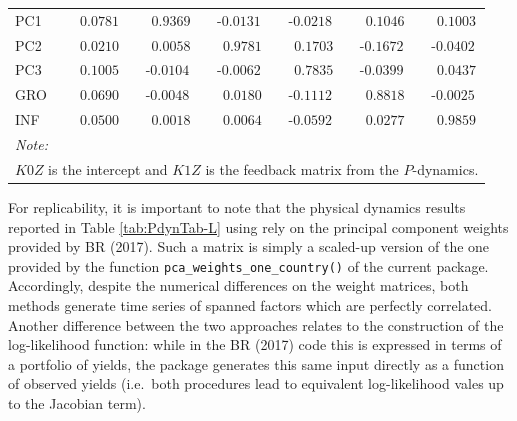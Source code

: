 \begin{table}[!h]
\begin{tabular}[t]{lcccccc}
\hspace{1em}PC1 & $\phantom{0}\phantom{0}0.0781$ & $\phantom{0}\phantom{0}0.9369$ & $\phantom{0}\text{-}0.0131$ & $\phantom{0}\text{-}0.0218$ & $\phantom{0}\phantom{0}0.1046$ & $\phantom{0}\phantom{0}0.1003$\\
\hspace{1em}PC2 & $\phantom{0}\phantom{0}0.0210$ & $\phantom{0}\phantom{0}0.0058$ & $\phantom{0}\phantom{0}0.9781$ & $\phantom{0}\phantom{0}0.1703$ & $\phantom{0}\text{-}0.1672$ & $\phantom{0}\text{-}0.0402$\\
\hspace{1em}PC3 & $\phantom{0}\phantom{0}0.1005$ & $\phantom{0}\text{-}0.0104$ & $\phantom{0}\text{-}0.0062$ & $\phantom{0}\phantom{0}0.7835$ & $\phantom{0}\text{-}0.0399$ & $\phantom{0}\phantom{0}0.0437$\\
\hspace{1em}GRO & $\phantom{0}\phantom{0}0.0690$ & $\phantom{0}\text{-}0.0048$ & $\phantom{0}\phantom{0}0.0180$ & $\phantom{0}\text{-}0.1112$ & $\phantom{0}\phantom{0}0.8818$ & $\phantom{0}\text{-}0.0025$\\
\hspace{1em}INF & $\phantom{0}\phantom{0}0.0500$ & $\phantom{0}\phantom{0}0.0018$ & $\phantom{0}\phantom{0}0.0064$ & $\phantom{0}\text{-}0.0592$ & $\phantom{0}\phantom{0}0.0277$ & $\phantom{0}\phantom{0}0.9859$\\
\bottomrule
\multicolumn{7}{l}{\rule{0pt}{1em}\textit{Note: }}\\
\multicolumn{7}{l}{\rule{0pt}{1em}$K0Z$ is the intercept and $K1Z$ is the feedback matrix from the $P$-dynamics.}\\
\end{tabular}
\end{table}

For replicability, it is important to note that the physical dynamics results reported in Table \ref{tab:PdynTab-L} using  rely on the principal component weights provided by BR (2017). Such a matrix is simply a scaled-up version of the one provided by the function \texttt{pca\_weights\_one\_country()} of the current package. Accordingly, despite the numerical differences on the weight matrices, both methods generate time series of spanned factors which are perfectly correlated. Another difference between the two approaches relates to the construction of the log-likelihood function: while in the BR (2017) code this is expressed in terms of a portfolio of yields, the  package generates this same input directly as a function of observed yields (i.e.~both procedures lead to equivalent log-likelihood vales up to the Jacobian term).

